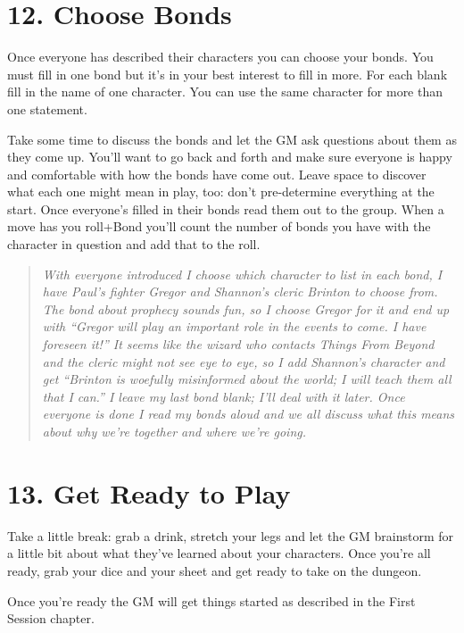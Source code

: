 \section{12. Choose Bonds}

Once everyone has described their characters you can choose your bonds. You must fill in one bond but it's in your best interest to fill in more. For each blank fill in the name of one character. You can use the same character for more than one statement.

Take some time to discuss the bonds and let the GM ask questions about them as they come up. You'll want to go back and forth and make sure everyone is happy and comfortable with how the bonds have come out. Leave space to discover what each one might mean in play, too: don't pre-determine everything at the start. Once everyone's filled in their bonds read them out to the group. When a move has you roll+Bond you'll count the number of bonds you have with the character in question and add that to the roll.

\begin{quote}
\emph{With everyone introduced I choose which character to list in each bond, I have Paul's fighter Gregor and Shannon's cleric Brinton to choose from. The bond about prophecy sounds fun, so I choose Gregor for it and end up with ``Gregor will play an important role in the events to come. I have foreseen it!'' It seems like the wizard who contacts Things From Beyond and the cleric might not see eye to eye, so I add Shannon's character and get ``Brinton is woefully misinformed about the world; I will teach them all that I can.'' I leave my last bond blank; I'll deal with it later. Once everyone is done I read my bonds aloud and we all discuss what this means about why we're together and where we're going.}
\end{quote}
\section{13. Get Ready to Play}

Take a little break: grab a drink, stretch your legs and let the GM brainstorm for a little bit about what they've learned about your characters. Once you're all ready, grab your dice and your sheet and get ready to take on the dungeon.

Once you're ready the GM will get things started as described in the First Session chapter.

